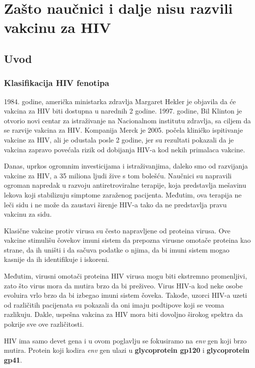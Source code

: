 \chapter{Zašto naučnici i dalje nisu razvili vakcinu za HIV}
\section{Uvod}
\subsection{Klasifikacija HIV fenotipa}

1984. godine, američka ministarka zdravlja Margaret Hekler je objavila da će vakcina za HIV biti dostupna u narednih 2 godine. 1997. godine, Bil Klinton je otvorio novi centar za istraživanje na Nacionalnom institutu zdravlja, sa ciljem da se razvije vakcina za HIV. Kompanija Merck je 2005. počela kliničko ispitivanje vakcine za HIV, ali je odustala  posle 2 godine, jer su rezultati pokazali da je vakcina zapravo povećala rizik od dobijanja HIV-a kod nekih primalaca vakcine.

Danas, uprkos ogromnim investicijama i istraživanjima, daleko smo od razvijanja vakcine za HIV, a 35 miliona ljudi žive s tom bolešću. Naučnici su napravili ogroman napredak u razvoju antiretroviralne terapije, koja predstavlja mešavinu lekova koji stabilizuju simptome zaraženog pacijenta. Međutim, ova terapija ne leči sidu i ne može da zaustavi širenje HIV-a tako da ne predstavlja pravu vakcinu za sidu. 

Klasične vakcine protiv virusa su često napravljene od proteina virusa. Ove vakcine stimulišu čovekov imuni sistem da prepozna virusne omotače proteina kao strane, da ih uništi i da sačuva podatke o njima, da bi imuni sistem mogao kasnije da ih identifikuje i iskoreni.

Međutim, virusni omotači proteina HIV virusa mogu biti ekstremno promenljivi, zato što virus mora da mutira brzo da bi preživeo. Virus HIV-a kod neke osobe evoluira vrlo brzo da bi izbegao imuni sistem čoveka. Takođe, uzorci HIV-a uzeti od različitih pacijenata su pokazali da oni imaju podtipove koji se veoma razlikuju. Dakle, uspešna vakcina za HIV mora biti dovoljno širokog spektra da pokrije sve ove različitosti. 

HIV ima samo devet gena i u ovom poglavlju se fokusiramo na \textit{env} gen koji brzo mutira. Protein koji kodira \textit{env} gen ulazi u \textbf{glycoprotein gp120} i \textbf{glycoprotein gp41}.

